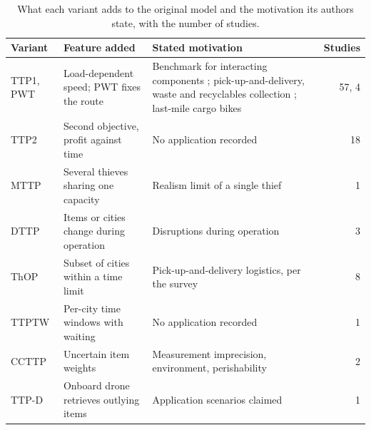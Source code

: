 \begin{table}[htbp]
\centering
\footnotesize
\caption{What each variant adds to the original model and the motivation its authors state, with the number of studies.}
\label{tab:applications}
\setlength{\tabcolsep}{4pt}
\renewcommand{\arraystretch}{1.15}
\begin{tabular}{@{}p{1.5cm}p{5.0cm}p{8.0cm}r@{}}
\toprule
\textbf{Variant} & \textbf{Feature added} & \textbf{Stated motivation} & \textbf{Studies} \\
\midrule
TTP1, PWT & Load-dependent speed; PWT fixes the route & Benchmark for interacting components \citep{bonyadi2013travelling}; pick-up-and-delivery, waste and recyclables collection \citep{sarkar2024travelling}; last-mile cargo bikes \citep{naumov2021identifying} & 57, 4 \\
TTP2 & Second objective, profit against time \citep{blank2017solving} & No application recorded & 18 \\
MTTP & Several thieves sharing one capacity & Realism limit of a single thief \citep{chand2016fast} & 1 \\
DTTP & Items or cities change during operation & Disruptions during operation \citep{sachdeva2020dynamic,herring2020dynamic,herring2020responsive} & 3 \\
ThOP & Subset of cities within a time limit \citep{santos2018thief} & Pick-up-and-delivery logistics, per the survey \citep{sarkar2024travelling} & 8 \\
TTPTW & Per-city time windows with waiting & No application recorded \citep{angmalisang2026traveling} & 1 \\
CCTTP & Uncertain item weights & Measurement imprecision, environment, perishability \citep{pathirage2024chance,don2025weighted} & 2 \\
TTP-D & Onboard drone retrieves outlying items & Application scenarios claimed \citep{murjani2026drive} & 1 \\
\bottomrule
\end{tabular}
\end{table}
